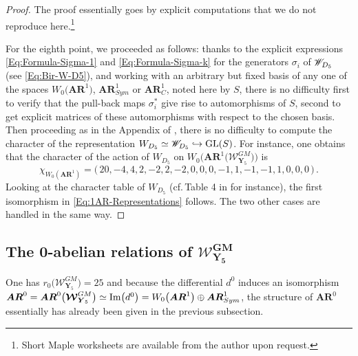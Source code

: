 \documentclass[11pt]{amsart}
\begin{document}
\begin{proof} 
The proof essentially goes by explicit computations that we do not reproduce here.\footnote{Short Maple worksheets are available from the author upon request.}

For the eighth point, we proceeded as follows:  thanks to the explicit expressions  \eqref{Eq:Formula-Sigma-1} and \eqref{Eq:Formula-Sigma-k} for the generators $\sigma_i$ of 
$\boldsymbol{\mathscr W}_{\hspace{-0.1cm}D_5}$ (see \eqref{Eq:Bir-W-D5}), and working with an arbitrary but fixed basis of any one of the spaces 
$W_0\big(\boldsymbol{AR}^1\big)$,  
$\boldsymbol{AR}^1_{Sym}$ or 
$\boldsymbol{AR}^1_C$, noted here by $S$, there is no difficulty first to verify that the pull-back maps $\sigma_i^*$ give rise to automorphisms of $S$, second to get explicit matrices of these automorphisms with respect to the chosen basis. 
 Then proceeding as in the Appendix of \cite{Pirio2022}, there is no difficulty to compute the character of the representation 
$W_{D_5}\simeq \boldsymbol{\mathscr W}_{\hspace{-0.1cm}D_5} \hookrightarrow {\rm GL}(S)$. For instance, one obtains that the 
character of the action of $W_{D_5}$ on $W_0\Big( \boldsymbol{AR}^1\big( \boldsymbol{\mathcal W}_{\boldsymbol{Y}_5}^{GM}\big)\Big)$ is 
$$ \chi_{W_0( \boldsymbol{AR}^1)}= \big( \, 20, -4, 4, 2, -2, 2, -2, 0, 0, 0, -1, 1, -1, -1, 1, 0, 0, 0\,\big)\, .
$$ 
Looking at the character table of $W_{D_5}$ (cf.\,Table 4 in \cite{Pirio2022} for instance), the first isomorphism in \eqref{Eq:1AR-Representations} follows. 
 The two other cases are handled in the same way. 
\end{proof}



\subsection{\bf The  0-abelian relations of $\boldsymbol{{\mathcal W}^{GM}_{ {Y}_5}}$}
\label{SS:0-AR-of-WGMY5}
%
%
One has 
$r_0\big( 
\boldsymbol{\mathcal W}^{GM}_{ \boldsymbol{Y}_5}
\big)=25$ and because the differential $d^0$ induces an isomorphism 
$\boldsymbol{AR}^0=\boldsymbol{AR}^0\big( 
\boldsymbol{\mathcal W}^{GM}_{ \boldsymbol{Y}_5}
\big) \simeq {\rm Im}\big( d^0\big)= W_0\big( 
\boldsymbol{AR}^1\big)
\oplus \boldsymbol{AR}^1_{Sym}
$, the structure of $\boldsymbol{AR}^0$ essentially has already been given in the previous subsection. 
\end{document}
